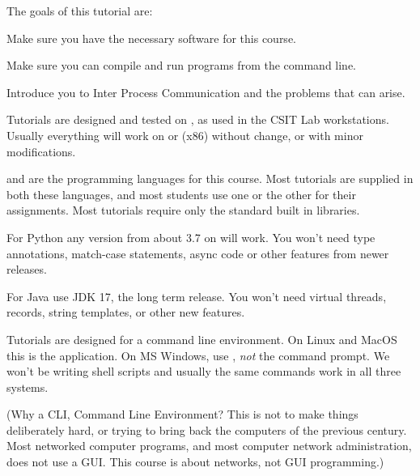 









The goals of this tutorial are:

\DOT Make sure you have the necessary software for this course.

\DOT Make sure you can compile and run programs from the command line.

\DOT Introduce you to Inter Process Communication and the problems that can arise.



Tutorials are designed and tested on , as used in the CSIT Lab workstations.
Usually everything will work on  or  (x86) without change,
or with minor modifications.

 and  are the  programming languages for this course.
Most tutorials are supplied in both these languages, and most students use one or the
other for their assignments. Most tutorials require only the standard built in libraries.

For Python any version from about 3.7 on will work. You won't need type annotations,
match-case statements, async code or other features from newer releases.

For Java use JDK 17, the long term release. You won't need virtual threads,
records, string templates, or other new features.

Tutorials are designed for a command line environment. On Linux and MacOS this is the
 application. On MS Windows, use , \emph{not} the command prompt.
We won't be writing shell scripts and usually the same commands work in all
three systems.

(Why a CLI, Command Line Environment? This is not to make things deliberately hard,
or trying to bring back the computers of the previous century. Most networked computer
programs, and most computer network administration, does not use a GUI. This course is
about networks, not GUI programming.)

